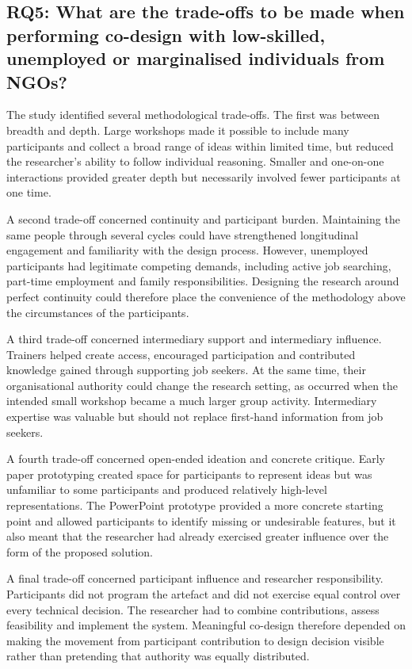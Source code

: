 \subsection{RQ5: What are the trade-offs to be made when performing co-design with low-skilled, unemployed or marginalised individuals from NGOs?}

The study identified several methodological trade-offs. The first was between breadth and depth. Large workshops made it possible to include many participants and collect a broad range of ideas within limited time, but reduced the researcher's ability to follow individual reasoning. Smaller and one-on-one interactions provided greater depth but necessarily involved fewer participants at one time.

A second trade-off concerned continuity and participant burden. Maintaining the same people through several cycles could have strengthened longitudinal engagement and familiarity with the design process. However, unemployed participants had legitimate competing demands, including active job searching, part-time employment and family responsibilities. Designing the research around perfect continuity could therefore place the convenience of the methodology above the circumstances of the participants.

A third trade-off concerned intermediary support and intermediary influence. Trainers helped create access, encouraged participation and contributed knowledge gained through supporting job seekers. At the same time, their organisational authority could change the research setting, as occurred when the intended small workshop became a much larger group activity. Intermediary expertise was valuable but should not replace first-hand information from job seekers.

A fourth trade-off concerned open-ended ideation and concrete critique. Early paper prototyping created space for participants to represent ideas but was unfamiliar to some participants and produced relatively high-level representations. The PowerPoint prototype provided a more concrete starting point and allowed participants to identify missing or undesirable features, but it also meant that the researcher had already exercised greater influence over the form of the proposed solution.

A final trade-off concerned participant influence and researcher responsibility. Participants did not program the artefact and did not exercise equal control over every technical decision. The researcher had to combine contributions, assess feasibility and implement the system. Meaningful co-design therefore depended on making the movement from participant contribution to design decision visible rather than pretending that authority was equally distributed.

